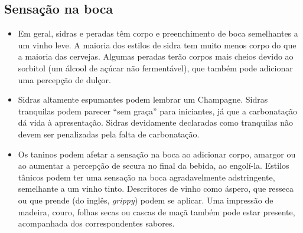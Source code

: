 \subsection*{Sensação na boca}
\begin{itemize}
\item Em geral, sidras e peradas têm corpo e preenchimento de boca semelhantes a um vinho leve. A maioria dos estilos de sidra tem muito menos corpo do que a maioria das cervejas. Algumas peradas terão corpos mais cheios devido ao sorbitol (um álcool de açúcar não fermentável), que também pode adicionar uma percepção de dulçor.
\item Sidras altamente espumantes podem lembrar um Champagne. Sidras tranquilas podem parecer “sem graça” para iniciantes, já que a carbonatação dá vida à apresentação. Sidras devidamente declaradas como tranquilas não devem ser penalizadas pela falta de carbonatação.
\item Os taninos podem afetar a sensação na boca ao adicionar corpo, amargor ou ao aumentar a percepção de secura no final da bebida, ao engolí-la. Estilos tânicos podem ter uma sensação na boca agradavelmente adstringente, semelhante a um vinho tinto. Descritores de vinho como áspero, que resseca ou que prende (do inglês, \textit{grippy}) podem se aplicar. Uma impressão de madeira, couro, folhas secas ou cascas de maçã também pode estar presente, acompanhada dos correspondentes sabores.
\end{itemize}